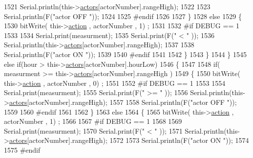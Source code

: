 \begin{DoxyCode}
1521                 Serial.println(this->\hyperlink{class_jetpack_a7e16d2f97837f9712a2e6de1c50d99db}{actors}[actorNumber].rangeHigh);
1522 
1523                 Serial.println(F(\textcolor{stringliteral}{"actor OFF "}));
1524 
1525 \textcolor{preprocessor}{            #endif  }
1526 
1527             \}
1528             \textcolor{keywordflow}{else} 
1529             \{
1530                 bitWrite( this->\hyperlink{class_jetpack_aca3142925a7b0834b34ae91d26af7765}{action} , actorNumber , 1) ;
1531 
1532 \textcolor{preprocessor}{            #if DEBUG == 1 }
1533 
1534                 Serial.print(measurment);
1535                 Serial.print(F(\textcolor{stringliteral}{" < "} ));
1536                 Serial.println(this->\hyperlink{class_jetpack_a7e16d2f97837f9712a2e6de1c50d99db}{actors}[actorNumber].rangeHigh);
1537 
1538                 Serial.println(F(\textcolor{stringliteral}{"actor ON "}));
1539 
1540 \textcolor{preprocessor}{            #endif  }
1541                 
1542             \}
1543         \}
1544     \}
1545     \textcolor{keywordflow}{else} \textcolor{keywordflow}{if}(hour > this->\hyperlink{class_jetpack_a7e16d2f97837f9712a2e6de1c50d99db}{actors}[actorNumber].hourLow)
1546     \{
1547 
1548         \textcolor{keywordflow}{if}( measurment >= this->\hyperlink{class_jetpack_a7e16d2f97837f9712a2e6de1c50d99db}{actors}[actorNumber].rangeHigh )
1549         \{
1550             bitWrite( this->\hyperlink{class_jetpack_aca3142925a7b0834b34ae91d26af7765}{action} , actorNumber , 0) ;
1551 
1552 \textcolor{preprocessor}{        #if DEBUG == 1 }
1553 
1554             Serial.print(measurment);
1555             Serial.print(F(\textcolor{stringliteral}{" >= "} ));
1556             Serial.println(this->\hyperlink{class_jetpack_a7e16d2f97837f9712a2e6de1c50d99db}{actors}[actorNumber].rangeHigh);
1557 
1558             Serial.println(F(\textcolor{stringliteral}{"actor OFF "}));
1559 
1560 \textcolor{preprocessor}{        #endif  }
1561 
1562         \}
1563         \textcolor{keywordflow}{else} 
1564         \{
1565             bitWrite( this->\hyperlink{class_jetpack_aca3142925a7b0834b34ae91d26af7765}{action} , actorNumber , 1) ;
1566 
1567 \textcolor{preprocessor}{        #if DEBUG == 1 }
1568 
1569             Serial.print(measurment);
1570             Serial.print(F(\textcolor{stringliteral}{" < "} ));
1571             Serial.println(this->\hyperlink{class_jetpack_a7e16d2f97837f9712a2e6de1c50d99db}{actors}[actorNumber].rangeHigh);
1572 
1573             Serial.println(F(\textcolor{stringliteral}{"actor ON "}));
1574 
1575 \textcolor{preprocessor}{        #endif  }

\end{DoxyCode}
